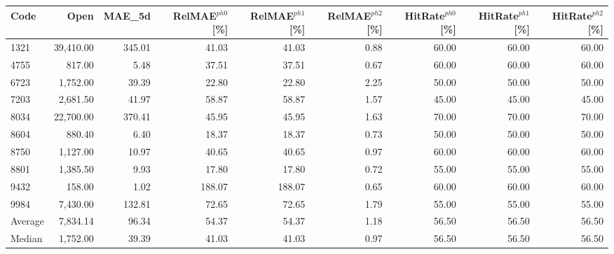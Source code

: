 \begingroup
\footnotesize
\begin{tabular}{lrrrrrrrr}
\hline
Code & Open & MAE\_5d & RelMAE$^{ph0}$[\%] & RelMAE$^{ph1}$[\%] & RelMAE$^{ph2}$[\%] & HitRate$^{ph0}$[\%] & HitRate$^{ph1}$[\%] & HitRate$^{ph2}$[\%] \\
\hline
1321 & 39,410.00 & 345.01 & 41.03 & 41.03 & 0.88 & 60.00 & 60.00 & 60.00 \\
4755 & 817.00 & 5.48 & 37.51 & 37.51 & 0.67 & 60.00 & 60.00 & 60.00 \\
6723 & 1,752.00 & 39.39 & 22.80 & 22.80 & 2.25 & 50.00 & 50.00 & 50.00 \\
7203 & 2,681.50 & 41.97 & 58.87 & 58.87 & 1.57 & 45.00 & 45.00 & 45.00 \\
8034 & 22,700.00 & 370.41 & 45.95 & 45.95 & 1.63 & 70.00 & 70.00 & 70.00 \\
8604 & 880.40 & 6.40 & 18.37 & 18.37 & 0.73 & 50.00 & 50.00 & 50.00 \\
8750 & 1,127.00 & 10.97 & 40.65 & 40.65 & 0.97 & 60.00 & 60.00 & 60.00 \\
8801 & 1,385.50 & 9.93 & 17.80 & 17.80 & 0.72 & 55.00 & 55.00 & 55.00 \\
9432 & 158.00 & 1.02 & 188.07 & 188.07 & 0.65 & 60.00 & 60.00 & 60.00 \\
9984 & 7,430.00 & 132.81 & 72.65 & 72.65 & 1.79 & 55.00 & 55.00 & 55.00 \\
Average & 7,834.14 & 96.34 & 54.37 & 54.37 & 1.18 & 56.50 & 56.50 & 56.50 \\
Median & 1,752.00 & 39.39 & 41.03 & 41.03 & 0.97 & 56.50 & 56.50 & 56.50 \\
\hline
\end{tabular}
\endgroup
